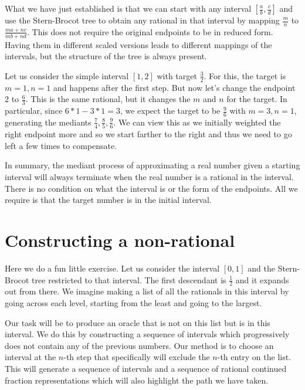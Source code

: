 \documentclass[12pt]{article}
\theoremstyle{remark}
\begin{document}
What we have just established is that we can start with any interval $[\frac{a}{b}, \frac{c}{d}]$ and use the Stern-Brocot tree to obtain any rational in that interval by mapping $\frac{m}{n}$ to $\frac{ma + nc}{mb + nd}$. This does not require the original endpoints to be in reduced form. Having them in different scaled versions leads to different mappings of the intervals, but the structure of the tree is always present. 

Let us consider the simple interval $[1, 2]$ with target $\frac{3}{2}$. For this, the target is $m=1, n=1$ and happens after the first step. But now let's change the endpoint $2$ to $\frac{6}{3}$. This is the same rational, but it changes the $m$ and $n$ for the target. In particular, since $6*1-3*1 = 3$, we expect the target to be $\frac{9}{6}$ with $m=3, n=1$, generating the mediants $\frac{7}{4}, \frac{8}{5}, \frac{9}{6}$.  We can view this as we initially weighted the right endpoint more and so we start farther to the right and thus we need to go left a few times to compensate. 

In summary, the mediant process of approximating a real number given a starting interval will always terminate when the real number is a rational in the interval. There is no condition on what the interval is or the form of the endpoints. All we require is that the target number is in the initial interval.


\section{Constructing a non-rational} \label{app:uncountable}

Here we do a fun little exercise. Let us consider the interval $[0,1]$ and the Stern-Brocot tree restricted to that interval. The first descendant is $\frac{1}{2}$ and it expands out from there. We imagine making a list of all the rationals in this interval by going across each level, starting from the least and going to the largest. 

Our task will be to produce an oracle that is not on this list but is in this interval. We do this by constructing a sequence of intervals which progressively does not contain any of the previous numbers. Our method is to choose an interval at the $n$-th step that specifically will exclude the $n$-th entry on the list. This will generate a sequence of intervals and a sequence of rational continued fraction representations which will also highlight the path we have taken. 
\end{document}
